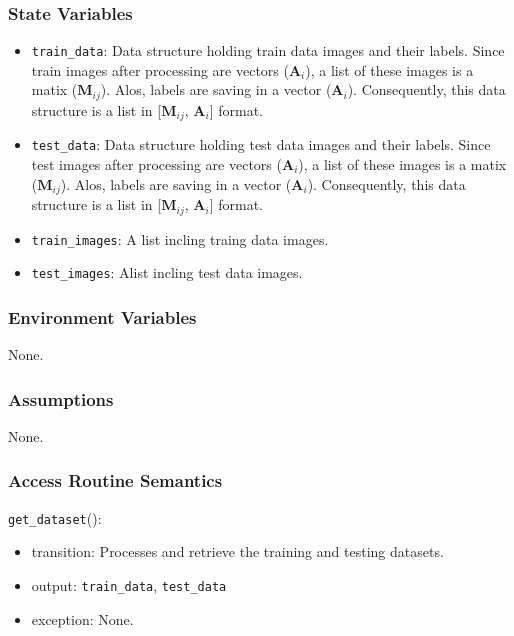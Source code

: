 \documentclass[12pt, titlepage]{article}
\def\code#1{\texttt{#1}}
\begin{document}
\subsubsection{State Variables}
\begin{itemize}
  \item \code{train\_data}: Data structure holding train data images and their labels. 
  Since train images after processing are vectors ($\mathbf{A}_{i}$), a list of these images is 
  a matix ($\mathbf{M}_{ij}$). Alos, labels are saving in a vector ($\mathbf{A}_{i}$). 
  Consequently, this data structure is a list in [$\mathbf{M}_{ij}$, $\mathbf{A}_{i}$] format.
  \item \code{test\_data}: Data structure holding test data images and their labels. 
  Since test images after processing are vectors ($\mathbf{A}_{i}$), a list of these images is 
  a matix ($\mathbf{M}_{ij}$). Alos, labels are saving in a vector ($\mathbf{A}_{i}$). 
  Consequently, this data structure is a list in [$\mathbf{M}_{ij}$, $\mathbf{A}_{i}$] format.
  \item \code{train\_images}: A list incling traing data images.
  \item \code{test\_images}:  Alist incling test data images.
\end{itemize}

\subsubsection{Environment Variables}
None.

\subsubsection{Assumptions}
None.

\subsubsection{Access Routine Semantics}

\noindent \code{get\_dataset}():
\begin{itemize}
  \item transition: Processes and retrieve the training and testing datasets.
  \item output: \code{train\_data}, \code{test\_data}
  \item exception: None.
\end{itemize}
\end{document}

